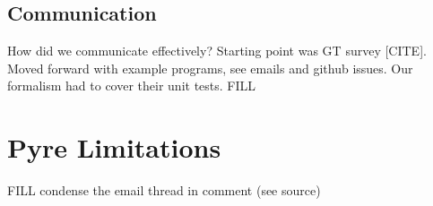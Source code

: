 \documentclass[english,cleveref,submission]{programming}
\begin{document}
\subsection{Communication}

How did we communicate effectively?
Starting point was GT survey [CITE].
Moved forward with example programs, see emails and github issues.
Our formalism had to cover their unit tests.
FILL



{\sloppy
\printbibliography
}

\appendix

\section{Pyre Limitations}

FILL condense the email thread in comment (see source)
\end{document}
